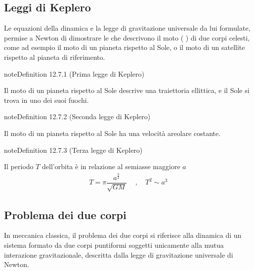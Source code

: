 \documentclass[letterpaper,10pt,italian]{jupyterBook}
\begin{document}
\subsection{Leggi di Keplero}
\label{\detokenize{ch/mechanics/dynamics-motion-gravitation:leggi-di-keplero}}
\sphinxAtStartPar
Le equazioni della dinamica e la legge di gravitazione universale da lui formulate, permise a Newton di dimostrare le  che descrivono il moto  ( ) di due corpi celesti, come ad esempio il moto di un pianeta rispetto al Sole, o il moto di un satellite rispetto al pianeta di riferimento.
\label{ch/mechanics/dynamics-motion-gravitation:kepler-law-1}
\begin{sphinxadmonition}{note}{Definition 12.7.1 (Prima legge di Keplero)}



\sphinxAtStartPar
Il moto di un pianeta rispetto al Sole descrive una traiettoria ellittica, e il Sole si trova in uno dei suoi fuochi.
\end{sphinxadmonition}
\label{ch/mechanics/dynamics-motion-gravitation:kepler-law-2}
\begin{sphinxadmonition}{note}{Definition 12.7.2 (Seconda legge di Keplero)}



\sphinxAtStartPar
Il moto di un pianeta rispetto al Sole ha una velocità areolare costante.
\end{sphinxadmonition}
\label{ch/mechanics/dynamics-motion-gravitation:kepler-law-3}
\begin{sphinxadmonition}{note}{Definition 12.7.3 (Terza legge di Keplero)}



\sphinxAtStartPar
Il periodo \(T\) dell’orbita è in relazione al semiasse maggiore \(a\)
\begin{equation*}
\begin{split}T = \pi \dfrac{a^{\frac{3}{2}}}{\sqrt{GM}} \ \quad , \quad T^2 \sim a^3\end{split}
\end{equation*}\end{sphinxadmonition}


\subsection{Problema dei due corpi}
\label{\detokenize{ch/mechanics/dynamics-motion-gravitation:problema-dei-due-corpi}}\label{\detokenize{ch/mechanics/dynamics-motion-gravitation:physics-hs-mechanics-dynamics-motion-gravitation-two-bodies}}
\sphinxAtStartPar
In meccanica classica, il problema dei due corpi si riferisce alla dinamica di un sistema formato da due corpi puntiformi soggetti unicamente alla mutua interazione gravitazionale, descritta dalla legge di gravitazione universale di Newton.
\end{document}
